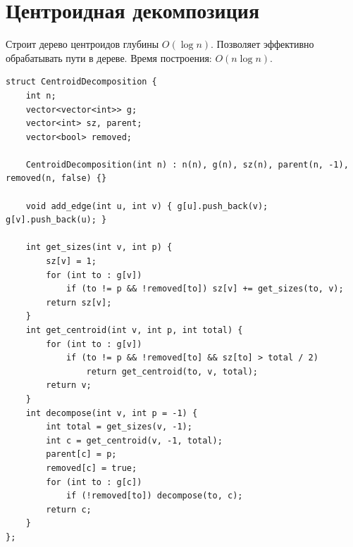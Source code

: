 \section{Центроидная декомпозиция}
Строит дерево центроидов глубины $O(\log n)$. Позволяет эффективно обрабатывать пути в дереве. Время построения: $O(n \log n)$.
\begin{lstlisting}[name=centroid_decomp]
struct CentroidDecomposition {
    int n;
    vector<vector<int>> g;
    vector<int> sz, parent;
    vector<bool> removed;

    CentroidDecomposition(int n) : n(n), g(n), sz(n), parent(n, -1), removed(n, false) {}

    void add_edge(int u, int v) { g[u].push_back(v); g[v].push_back(u); }

    int get_sizes(int v, int p) {
        sz[v] = 1;
        for (int to : g[v])
            if (to != p && !removed[to]) sz[v] += get_sizes(to, v);
        return sz[v];
    }
    int get_centroid(int v, int p, int total) {
        for (int to : g[v])
            if (to != p && !removed[to] && sz[to] > total / 2)
                return get_centroid(to, v, total);
        return v;
    }
    int decompose(int v, int p = -1) {
        int total = get_sizes(v, -1);
        int c = get_centroid(v, -1, total);
        parent[c] = p;
        removed[c] = true;
        for (int to : g[c])
            if (!removed[to]) decompose(to, c);
        return c;
    }
};
\end{lstlisting}
